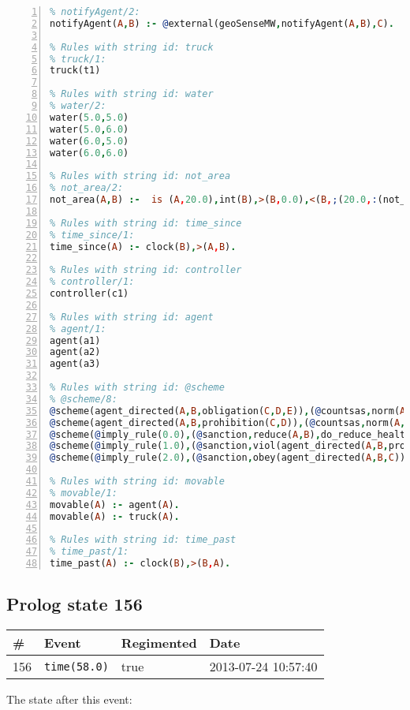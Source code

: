 \documentclass[11pt]{article}\usepackage[utf8]{inputenc}\usepackage{geometry}
\begin{document}
\begin{lstlisting}[language=Prolog, numbers=left]
% Rules with string id: notifyAgent
% notifyAgent/2:
notifyAgent(A,B) :- @external(geoSenseMW,notifyAgent(A,B),C).

% Rules with string id: truck
% truck/1:
truck(t1)

% Rules with string id: water
% water/2:
water(5.0,5.0)
water(5.0,6.0)
water(6.0,5.0)
water(6.0,6.0)

% Rules with string id: not_area
% not_area/2:
not_area(A,B) :-  is (A,20.0),int(B),>(B,0.0),<(B,;(20.0,:(not_area(A,B), is (-(B),20.0)))),int(A),>(A,0.0),<(A,;(20.0,:(area(A,B),-(int(A))))),int(B),>(A,0.0),>(B,0.0),<(A,21.0),<(B,21.0).

% Rules with string id: time_since
% time_since/1:
time_since(A) :- clock(B),>(A,B).

% Rules with string id: controller
% controller/1:
controller(c1)

% Rules with string id: agent
% agent/1:
agent(a1)
agent(a2)
agent(a3)

% Rules with string id: @scheme
% @scheme/8:
@scheme(agent_directed(A,B,obligation(C,D,E)),(@countsas,norm(A,B,F,obligation(C,D,E)),F),false,(listTrue(C)),(time_past(D)),false,[plus(viol(agent_directed(A,B,obligation(C,D,E))))|[]],[plus(obey(agent_directed(A,B,obligation(C,D,E))))|[]])
@scheme(agent_directed(A,B,prohibition(C,D)),(@countsas,norm(A,B,E,prohibition(C,D)),E),(listTrue(C)),false,(false),false,[plus(viol(agent_directed(A,B,prohibition(C,D))))|[]],[plus(obey(agent_directed(A,B,prohibition(C,D))))|[]])
@scheme(@imply_rule(0.0),(@sanction,reduce(A,B),do_reduce_health(A,B),notifyAgent(A,changed(status))),true,false,false,false,[min(reduce(A,B))|[]],[])
@scheme(@imply_rule(1.0),(@sanction,viol(agent_directed(A,B,prohibition(C,D))),do_sanction(D)),true,false,false,false,[min(viol(agent_directed(A,B,prohibition(C,D))))|[]],[])
@scheme(@imply_rule(2.0),(@sanction,obey(agent_directed(A,B,C))),true,false,false,false,[min(obey(agent_directed(A,B,C)))|[]],[])

% Rules with string id: movable
% movable/1:
movable(A) :- agent(A).
movable(A) :- truck(A).

% Rules with string id: time_past
% time_past/1:
time_past(A) :- clock(B),>(B,A).

\end{lstlisting}
\clearpage 
\subsection{Prolog state 156}
\begin{table}[ht]
\centering 
\begin{tabular}{l l l l} 
\textbf{\#} & \textbf{Event} & \textbf{Regimented} & \textbf{Date} \\ [0.5ex] 
\hline
156&\texttt{time(58.0)}&true&2013-07-24 10:57:40\\ [1ex] \hline\end{tabular}
\end{table}
The state after this event:
\end{document}

